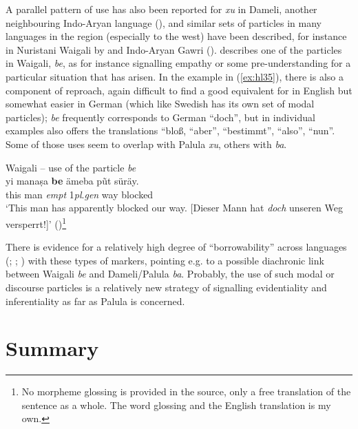 \documentclass[output=paper]{langsci/langscibook}
\begin{document}
A parallel pattern of use has also been reported for \textit{xu} in Dameli, another neighbouring Indo-Aryan language (\citealt[168]{Perder2013}), and similar sets of particles in many languages in the region (especially to the west) have been described, for instance in Nuristani Waigali by \cite[166--188]{Degener1998} and Indo-Aryan Gawri (\citealt[159--166]{Baart1999}). \citeauthor{Degener1998} describes one of the particles in Waigali, \textit{be}, as for instance signalling empathy or some pre-understanding for a particular situation that has arisen. In the example in ‎(\ref{ex:hl35}), there is also a component of reproach, again difficult to find a good equivalent for in English but somewhat easier in German (which like Swedish has its own set of modal particles); \textit{be} frequently corresponds to German “doch”, but in individual examples \citeauthor{Degener1998} also offers the translations “bloß, “aber”, “bestimmt”, “also”, “nun”.  Some of those uses seem to overlap with Palula \textit{xu}, others with \textit{ba}.


\begin{exe}
\ex Waigali -- use of the particle \textit{be} \label{ex:hl35}\\
	\gll yi manaṣa \textbf{be} ämeba pũt süräy.\\
	this man \textit{empt} 1\textit{pl}.\textit{gen} way blocked\\
	\trans ‘This man has apparently blocked our way. [Dieser Mann hat \textit{doch} unseren Weg versperrt!]’ (\citealt[167]{Degener1998})\footnote{No morpheme glossing is provided in the source, only a free translation of the sentence as a whole. The word glossing and the English translation is my own.}
\end{exe}

There is evidence for a relatively high degree of “borrowability” across languages (\citealt{Svard2014}; \citealt{LiljegrenSvard2017}; \citealt[183–184]{Perder2013}) with these types of markers, pointing e.g. to a possible diachronic link between Waigali \textit{be} and Dameli/Palula \textit{ba}. Probably, the use of such modal or discourse particles is a relatively new strategy of signalling evidentiality and inferentiality as far as Palula is concerned.

\section{Summary}\label{s:hl7}
\end{document}
